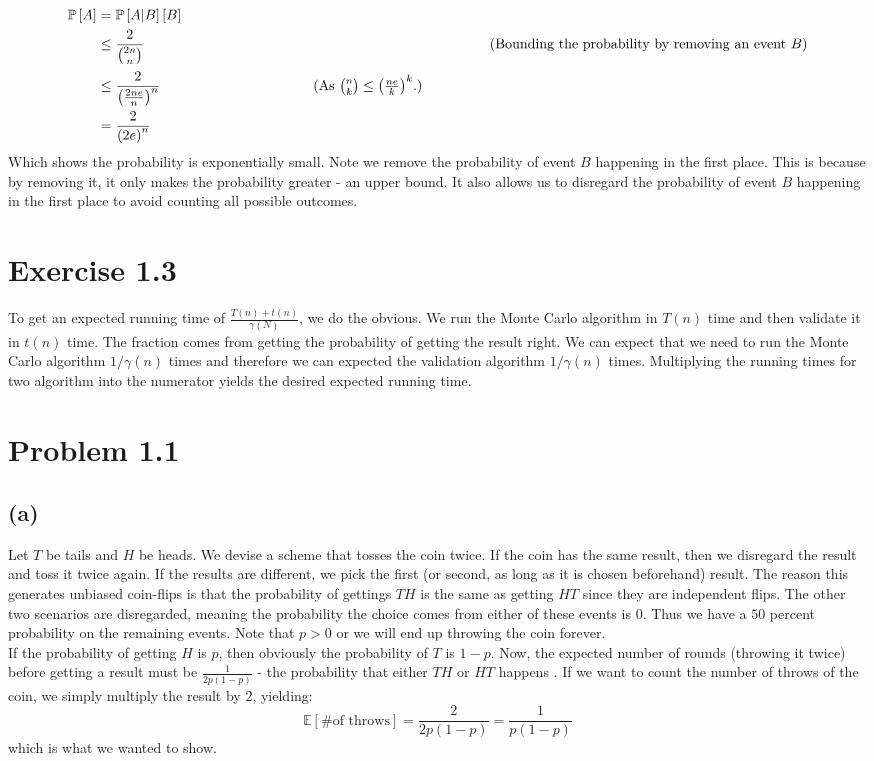 \documentclass[a4paper]{article}
\newcommand{\comment}[1]{%
  \text{\phantom{(#1)}} \tag{#1}}
\begin{document}
\begin{align*}
  \mathbb{P}\left[ A \right] &= \mathbb{P}\left[A|B\right]\left[B\right] \\
                             &\leq \frac{2}{\binom{2n}{n}} \comment{Bounding the probability by removing an event $B$} \\
                             &\leq\frac{2}{\left(\frac{2ne}{n}\right)^n} \comment{As $\binom{n}{k}\leq \left(\frac{ne}{k}\right)^k$.} \\
                             &=\frac{2}{\left(2e\right)^n}
\end{align*}
Which shows the probability is exponentially small. Note we remove the probability of event $B$ happening in the first place. This is because by removing it, it only makes the probability greater - an upper bound. It also allows us to disregard the probability of event $B$ happening in the first place to avoid counting all possible outcomes.

\section{Exercise 1.3}
To get an expected running time of $\frac{T(n)+t(n)}{\gamma (N)}$, we do the obvious. We run the Monte Carlo algorithm in $T(n)$ time and then validate it in $t(n)$ time. The fraction comes from getting the probability of getting the result right. We can expect that we need to run the Monte Carlo algorithm $1/\gamma (n)$ times and therefore we can expected the validation algorithm $1/\gamma (n)$ times. Multiplying the running times for two algorithm into the numerator yields the desired expected running time.

\section{Problem 1.1}
\subsection{(a)}
Let $T$ be tails and $H$ be heads. We devise a scheme that tosses the coin twice. If the coin has the same result, then we disregard the result and toss it twice again. If the results are different, we pick the first (or second, as long as it is chosen beforehand) result. The reason this generates unbiased coin-flips is that the probability of gettings $TH$ is the same as getting $HT$ since they are independent flips. The other two scenarios are disregarded, meaning the probability the choice comes from either of these events is $0$. Thus we have a $50$ percent probability on the remaining events. Note that $p>0$ or we will end up throwing the coin forever.\\
If the probability of getting $H$ is $p$, then obviously the probability of $T$ is $1-p$. Now, the expected number of rounds  (throwing it twice) before getting a result must be $\frac{1}{2p(1-p)}$ - the probability that either $TH$ or $HT$ happens . If we want to count the number of throws of the coin, we simply multiply the result by $2$, yielding:
$$
\mathbb{E}\left[ \mbox{\# of throws} \right]=\frac{2}{2p(1-p)}=\frac{1}{p(1-p)}
$$
which is what we wanted to show.
\end{document}
